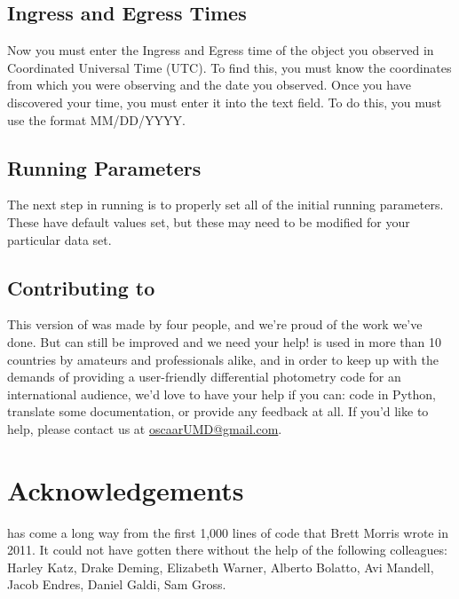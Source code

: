 \documentclass{article}
\begin{document}
\subsection{Ingress and Egress Times}
Now you must enter the Ingress and Egress time of the object you observed in Coordinated Universal Time (UTC). To find this, you must know the coordinates from which you were observing and the date you observed. Once you have discovered your time, you must enter it into the text field. To do this, you must use the format MM/DD/YYYY.

\subsection{Running Parameters}
The next step in running \oscaar is to properly set all of the initial running parameters. These have default values set, but these may need to be modified for your particular data set.




\subsection{Contributing to \oscaar}
This version of \oscaar was made by four people, and we're proud of the work we've done. But \oscaar can still be improved and we need your help! \oscaar is used in more than 10 countries by amateurs and professionals alike, and in order to keep up with the demands of providing a user-friendly differential photometry code for an international audience, we'd love to have your help if you can: code in Python, translate some documentation, or provide any feedback at all. If you'd like to help, please contact us at \href{mailto:oscaarUMD@gmail.com}{oscaarUMD@gmail.com}. 




\section{Acknowledgements}
\oscaar has come a long way from the first 1,000 lines of code that Brett Morris wrote in 2011. It could not have gotten there without the help of the following colleagues: 
Harley Katz, Drake Deming, Elizabeth Warner, Alberto Bolatto, Avi Mandell, Jacob Endres, Daniel Galdi, Sam Gross.

	
\end{document}
